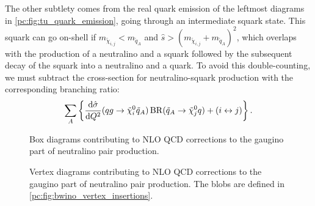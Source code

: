 \documentclass[../main.tex]{subfiles}
\begin{document}
The other subtlety comes from the real quark emission of the leftmost diagrams in \cref{pc:fig:tu_quark_emission}, going through an intermediate squark state.
This squark can go on-shell if \(m_{\tilde\chi_{i,j}} < m_{\tilde{q}_A}\) and \(\hat{s} > (m_{\tilde\chi_{i,j}} + m_{\tilde{q}_A})^2\), which overlaps with the production of a neutralino and a squark followed by the subsequent decay of the squark into a neutralino and a quark.
To avoid this double-counting, we must subtract the cross-section for neutralino-squark production with the corresponding branching ratio:
\begin{equation}
  \sum_A \cclosed{\d[Q^2]{\hat\sigma}(qg \to \tilde\chi^0_i \tilde{q}_A) \operatorname{BR}(\tilde{q}_A \to \tilde\chi^0_j q) + (i \leftrightarrow j)}.
\end{equation}



\begin{figure}[ht!]
  \centering
  \begin{subfigure}{0.24\textwidth}
    \centering
    \caption{}
  \end{subfigure}
  \begin{subfigure}{0.24\textwidth}
    \centering
    \caption{}
  \end{subfigure}
  \begin{subfigure}{0.24\textwidth}
    \centering
    \caption{}
  \end{subfigure}
  \begin{subfigure}{0.24\textwidth}
    \centering
    \caption{}
  \end{subfigure}
  \caption{Box diagrams contributing to NLO QCD corrections to the gaugino part of neutralino pair production.}
  \label{pc:fig:bwino_boxes}
\end{figure}

\begin{figure}[ht!]
  \centering
  \begin{subfigure}{0.24\textwidth}
    \centering
    \caption{}
  \end{subfigure}
  \begin{subfigure}{0.24\textwidth}
    \centering
    \caption{}
  \end{subfigure}
  \begin{subfigure}{0.24\textwidth}
    \centering
    \caption{}
  \end{subfigure}
  \begin{subfigure}{0.24\textwidth}
    \centering
    \caption{}
  \end{subfigure}
  \caption{Vertex diagrams contributing to NLO QCD corrections to the gaugino part of neutralino pair production. The blobs are defined in \cref{pc:fig:bwino_vertex_insertions}.}
  \label{pc:fig:bwino_vertices}
\end{figure}
\end{document}
